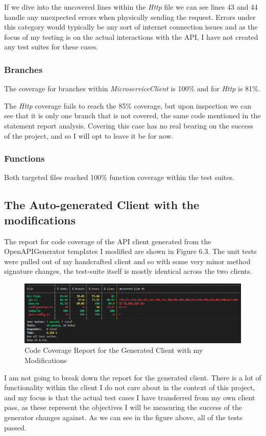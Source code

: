 If we dive into the uncovered lines within the \textit{Http} file we can see lines 43 and 44 handle any unexpected errors when physically sending the request. Errors under this category would typically be any sort of internet connection issues and as the focus of my testing is on the actual interactions with the API, I have not created any test suites for these cases.
\subsubsection{Branches}
The coverage for branches within \textit{MicroserviceClient} is 100\% and for \textit{Http} is 81\%.

The \textit{Http} coverage fails to reach the 85\% coverage, but upon inspection we can see that it is only one branch that is not covered, the same code mentioned in the statement report analysis. Covering this case has no real bearing on the success of the project, and so I will opt to leave it be for now.
\subsubsection{Functions}
Both targeted files reached 100\% function coverage within the test suites.
\subsection{The Auto-generated Client with the modifications}
The report for code coverage of the API client generated from the OpenAPIGenerator templates I modified are shown in Figure 6.3. The unit tests were pulled out of my handcrafted client and so with some very minor method signature changes, the test-suite itself is mostly identical across the two clients.
\begin{figure}[!htb]
\caption{Code Coverage Report for the Generated Client with my Modifications}
\centering
\includegraphics[scale=0.55]{FYP_Dissertation_template/Figures/modified-client-code-coverage.PNG}
\end{figure}
\FloatBarrier
I am not going to break down the report for the generated client. There is a lot of functionality within the client I do not care about in the context of this project, and my focus is that the actual test cases I have transferred from my own client pass, as these represent the objectives I will be measuring the success of the generator changes against. As we can see in the figure above, all of the tests passed.
